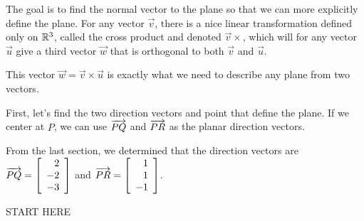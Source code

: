 \documentclass{ximera}
\begin{document}
  \begin{solution}
    The goal is to find the normal vector to the plane so that we can more explicitly define the plane. For any vector $\vec{v}$, there is a nice linear transformation defined only on $\RR^3$, called the cross product and denoted $\vec{v}\times$, which will for any vector $\vec{u}$ give a third vector $\vec{w}$ that is orthogonal to both $\vec{v}$ and $\vec{u}$.

    This vector $\vec{w}=\vec{v}\times\vec{u}$ is exactly what we need to describe any plane from two vectors.

    First, let's find the two direction vectors and point that define the plane. If we center at $P$, we can use  $\longvect{PQ}$ and $\longvect{PR}$ as the planar direction vectors. 

    From the last section, we determined that the direction vectors are $\longvect{PQ}=\startmat{r} 2 \\ -2 \\ -3 \stopmat$ and $\longvect{PR}=\startmat{r} 1 \\ 1 \\ -1 \stopmat$.
    
    START HERE
    

\end{solution}
\end{document}
